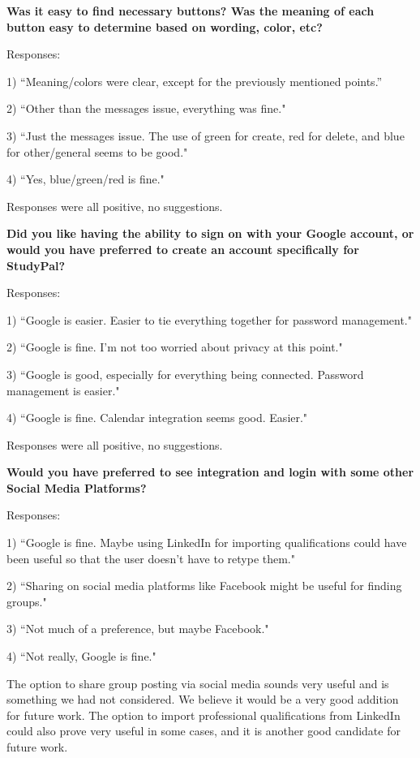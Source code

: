 \documentclass[conference]{IEEEtran}
\begin{document}
\textbf{Was it easy to find necessary buttons? Was the meaning of each button easy to determine based on wording, color, etc?}

Responses:

1) ``Meaning/colors were clear, except for the previously mentioned points.''

2) ``Other than the messages issue, everything was fine."

3) ``Just the messages issue.  The use of green for create, red for delete, and blue for other/general seems to be good."

4) ``Yes, blue/green/red is fine."

Responses were all positive, no suggestions.

\textbf{Did you like having the ability to sign on with your Google account, or would you have preferred to create an account specifically for StudyPal?}

Responses:

1) ``Google is easier. Easier to tie everything together for password management."

2) ``Google is fine.  I'm not too worried about privacy at this point."

3) ``Google is good, especially for everything being connected. Password management is easier."

4) ``Google is fine. Calendar integration seems good. Easier."

Responses were all positive, no suggestions.

\textbf{Would you have preferred to see integration and login with some other Social Media Platforms?}

Responses:

1) ``Google is fine.  Maybe using LinkedIn for importing qualifications could have been useful so that the user doesn't have to retype them."

2) ``Sharing on social media platforms like Facebook might be useful for finding groups."

3) ``Not much of a preference, but maybe Facebook."

4) ``Not really, Google is fine."

The option to share group posting via social media sounds very useful and is something we had not considered.  We believe it would be a very good addition for future work.  The option to import professional qualifications from LinkedIn could also prove very useful in some cases, and it is another good candidate for future work.
\end{document}
